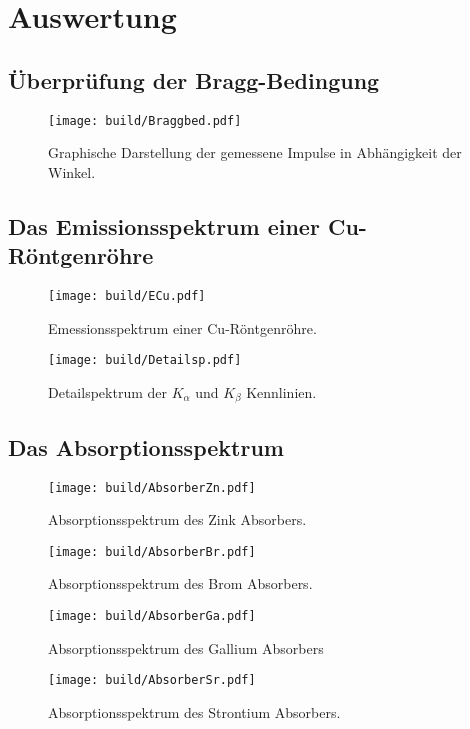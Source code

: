 \section{Auswertung}
\label{sec:Auswertung}

\subsection{Überprüfung der Bragg-Bedingung}

\begin{figure}[H]
    \centering
    \texttt{[image: build/Braggbed.pdf]}
    \label{fig:Braggb}
    \caption{Graphische Darstellung der gemessene Impulse in Abhängigkeit der Winkel.}
\end{figure}

\subsection{Das Emissionsspektrum einer Cu-Röntgenröhre}

\begin{figure}[H]
    \centering
    \texttt{[image: build/ECu.pdf]}
    \label{fig:ECu}
    \caption{Emessionsspektrum einer Cu-Röntgenröhre.}
\end{figure}

\begin{figure}[H]
    \centering
    \texttt{[image: build/Detailsp.pdf]}
    \label{fig:Detail}
    \caption{Detailspektrum der $K_\alpha$ und $K_\beta$ Kennlinien.}
\end{figure}

\subsection{Das Absorptionsspektrum}

\begin{figure}[H]
    \centering
    \texttt{[image: build/AbsorberZn.pdf]}
    \label{fig:AbZn}
    \caption{Absorptionsspektrum des Zink Absorbers.}
\end{figure}

\begin{figure}[H]
    \centering
    \texttt{[image: build/AbsorberBr.pdf]}
    \label{fig:AbBr}
    \caption{Absorptionsspektrum des Brom Absorbers.}
\end{figure}

\begin{figure}[H]
    \centering
    \texttt{[image: build/AbsorberGa.pdf]}
    \label{fig:AbGa}
    \caption{Absorptionsspektrum des Gallium Absorbers}
\end{figure}


\begin{figure}[H]
    \centering
    \texttt{[image: build/AbsorberSr.pdf]}
    \label{fig:AbSr}
    \caption{Absorptionsspektrum des Strontium Absorbers.}
\end{figure}